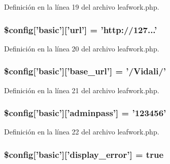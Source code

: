 Definición en la línea 19 del archivo leafwork.\-php.

\hypertarget{config_2leafwork_8php_acfa968ff50363c1152f99b10cbad5fc6}{
\subsubsection[{\$config}]{\setlength{\rightskip}{0pt plus 5cm}\${\bf config}\mbox{[}'basic'\mbox{]}\mbox{[}'url'\mbox{]} = 'http\-://127...'}}\label{config_2leafwork_8php_acfa968ff50363c1152f99b10cbad5fc6}


Definición en la línea 20 del archivo leafwork.\-php.

\hypertarget{config_2leafwork_8php_a03edb65478a44cb182c5c47a28e89e90}{
\subsubsection[{\$config}]{\setlength{\rightskip}{0pt plus 5cm}\${\bf config}\mbox{[}'basic'\mbox{]}\mbox{[}'base\-\_\-url'\mbox{]} = '/Vidali/'}}\label{config_2leafwork_8php_a03edb65478a44cb182c5c47a28e89e90}


Definición en la línea 21 del archivo leafwork.\-php.

\hypertarget{config_2leafwork_8php_ada49f44ebb25c291c5607ec0d272cea5}{
\subsubsection[{\$config}]{\setlength{\rightskip}{0pt plus 5cm}\${\bf config}\mbox{[}'basic'\mbox{]}\mbox{[}'adminpass'\mbox{]} = '123456'}}\label{config_2leafwork_8php_ada49f44ebb25c291c5607ec0d272cea5}


Definición en la línea 22 del archivo leafwork.\-php.

\hypertarget{config_2leafwork_8php_a8676578f6f768608f5d7ab8dc1db6f08}{
\subsubsection[{\$config}]{\setlength{\rightskip}{0pt plus 5cm}\${\bf config}\mbox{[}'basic'\mbox{]}\mbox{[}'display\-\_\-error'\mbox{]} = true}}\label{config_2leafwork_8php_a8676578f6f768608f5d7ab8dc1db6f08}


